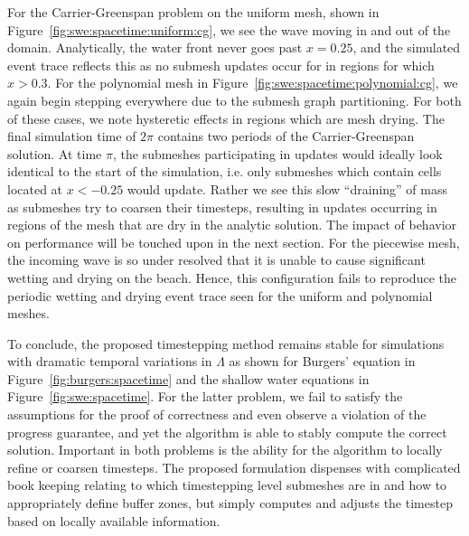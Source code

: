 For the Carrier-Greenspan problem on the uniform mesh, shown in Figure~\ref{fig:swe:spacetime:uniform:cg}, we see the wave moving in and out of the domain. Analytically, the water front never goes past $x=0.25$, and the simulated event trace reflects this as no submesh updates occur for in regions for which $x>0.3$.  For the polynomial mesh in Figure~\ref{fig:swe:spacetime:polynomial:cg}, we again begin stepping everywhere due to the submesh graph partitioning. For both of these cases, we note hysteretic effects in regions which are mesh drying. The final simulation time of $2 \pi$ contains two periods of the Carrier-Greenspan solution. At time $\pi$,  the submeshes participating in updates would ideally look identical to the start of the simulation, i.e. only submeshes which contain cells located at $x<-0.25$ would update. Rather we see this slow ``draining'' of mass as submeshes try to coarsen their timesteps, resulting in updates occurring in regions of the mesh that are dry in the analytic solution. The impact of behavior on performance will be touched upon in the next section. For the piecewise mesh, the incoming wave is so under resolved that it is unable to cause significant wetting and drying on the beach. Hence, this configuration fails to reproduce the periodic wetting and drying event trace seen for the uniform and polynomial meshes.

To conclude, the proposed timestepping method remains stable for simulations with dramatic temporal variations in $\Lambda$ as shown for Burgers' equation in Figure~\ref{fig:burgers:spacetime} and the shallow water equations in Figure~\ref{fig:swe:spacetime}. For the latter problem, we fail to satisfy the assumptions for the proof of correctness and even observe a violation of the progress guarantee, and yet the algorithm is able to stably compute the correct solution. Important in both problems is the ability for the algorithm to locally refine or coarsen timesteps. The proposed formulation dispenses with complicated book keeping relating to which timestepping level submeshes are in and how to appropriately define buffer zones, but simply computes and adjusts the timestep based on locally available information.



